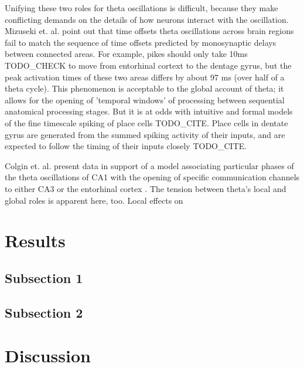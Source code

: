 \documentclass[10pt]{article}
\begin{document}
Unifying these two roles for theta oscillations is difficult, because they make conflicting demands on the details of how neurons interact with the oscillation.  Mizuseki et. al. \cite{Mizuseki2009} point out that time offsets theta oscillations across brain regions fail to match the sequence  of time offsets predicted by monosynaptic delays between connected areas.  For example, pikes should only take 10ms TODO_CHECK to move from entorhinal cortext to the dentage gyrus, but the peak activation times of these two areas differs by about 97 ms (over half of a theta cycle).  This phenomenon is acceptable to the global account of theta; it allows for the opening of 'temporal windows' of processing between sequential anatomical processing stages.  But it is at odds with intuitive and formal models of the fine timescale spiking of place cells TODO_CITE.  Place cells in dentate gyrus are generated from the summed spiking activity of their inputs, and are expected to follow the timing of their inputs closely TODO_CITE.

Colgin et. al. present data in support of a model associating particular phases of the theta oscillations of CA1 with the opening of specific communication channels to either CA3 or the entorhinal cortex \cite{Colgin2009}.  The tension between theta's local and global roles is apparent here, too.  Local effects on 

\section*{Results}

\subsection*{Subsection 1}

\subsection*{Subsection 2}

\section*{Discussion}
\cite{Mizuseki 2012}


\end{document}
